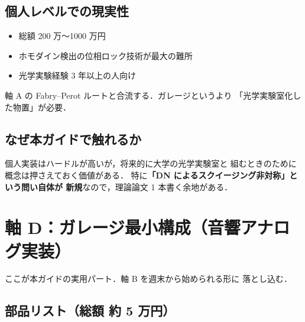 \documentclass[11pt,a4paper]{article}
\begin{document}
\subsection{個人レベルでの現実性}

\begin{itemize}
\item 総額 200 万〜1000 万円
\item ホモダイン検出の位相ロック技術が最大の難所
\item 光学実験経験 3 年以上の人向け
\end{itemize}

軸 A の Fabry--Perot ルートと合流する．ガレージというより
「光学実験室化した物置」が必要．

\subsection{なぜ本ガイドで触れるか}

個人実装はハードルが高いが，将来的に大学の光学実験室と
組むときのために概念は押さえておく価値がある．
特に\textbf{「DN によるスクイージング非対称」という問い自体が
新規}なので，理論論文 1 本書く余地がある．

\newpage
\section{軸 D：ガレージ最小構成（音響アナログ実装）}

ここが本ガイドの実用パート．軸 B を週末から始められる形に
落とし込む．

\subsection{部品リスト（総額 約 5 万円）}
\end{document}
